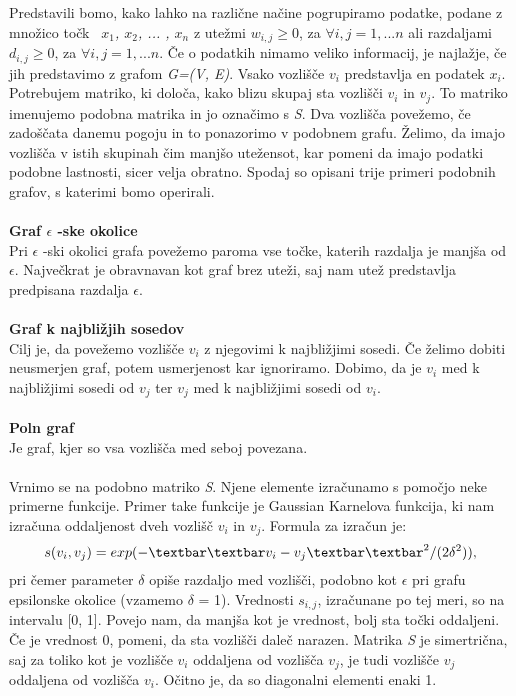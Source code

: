 \documentclass[a4paper, 10pt]{article}
\begin{document}
Predstavili bomo, kako lahko na različne načine pogrupiramo podatke, podane z množico točk \textsl{\ $x_1$, $x_2$, ... , $x_n$ } z utežmi $w_{i,j} \geq 0$, za $\forall i,j = 1, ... n$ ali razdaljami $d_{i,j} \geq 0$, za $\forall i,j = 1, ... n$. Če o podatkih nimamo veliko informacij, je najlažje, če jih predstavimo z grafom \textsl{G=(V, E)}. Vsako vozlišče $v_i$ predstavlja en podatek \textsl{$x_i$}. Potrebujem matriko, ki določa, kako blizu skupaj sta vozlišči $v_i$ in $v_j$. To matriko imenujemo podobna matrika in jo označimo s \textsl{S}. Dva vozlišča povežemo, če zadoščata danemu pogoju in to ponazorimo v podobnem grafu. Želimo, da imajo vozlišča v istih skupinah čim manjšo utežensot, kar pomeni da imajo podatki podobne lastnosti, sicer velja obratno. Spodaj so opisani trije primeri podobnih grafov, s katerimi bomo operirali.\\
\\
\textbf{Graf $\epsilon$ -ske okolice}\\
Pri $\epsilon$ -ski okolici grafa povežemo paroma vse točke, katerih razdalja je manjša od $\epsilon$. Največkrat je obravnavan kot graf brez uteži, saj nam utež predstavlja predpisana razdalja $\epsilon$.\\
\\
\textbf{Graf k najbližjih sosedov}\\
Cilj je, da povežemo vozlišče $v_i$ z njegovimi k najbližjimi sosedi. Če želimo dobiti neusmerjen graf, potem usmerjenost kar ignoriramo. Dobimo, da je $v_i$ med k najbližjimi sosedi od $v_j$ ter $v_j$ med k najbližjimi sosedi od $v_i$.\\
\\
\textbf{Poln graf}\\
Je graf, kjer so vsa vozlišča med seboj povezana.\\
\\
Vrnimo se na podobno matriko \textsl{S}. Njene elemente izračunamo s pomočjo neke primerne funkcije. Primer take funkcije je Gaussian Karnelova funkcija, ki nam izračuna oddaljenost dveh vozlišč $v_i$ in $v_j$. Formula za izračun je:$$s(v_i, v_j) = exp(-\textbar\textbar v_i - v_j \textbar\textbar^2 / (2\delta^2)),$$pri čemer parameter $\delta$ opiše razdaljo med vozlišči, podobno kot $\epsilon$ pri grafu epsilonske okolice (vzamemo $\delta$ = 1).  Vrednosti $s_{i,j}$, izračunane po tej meri, so na intervalu [0, 1]. Povejo nam, da manjša kot je vrednost, bolj sta točki oddaljeni. Če je vrednost 0, pomeni, da sta vozlišči daleč narazen. Matrika \textsl{S} je simertrična, saj za toliko kot je vozlišče $v_i$ oddaljena od vozlišča $v_j$, je tudi vozlišče $v_j$ oddaljena od vozlišča $v_i$. Očitno je, da so diagonalni elementi enaki 1.\\
\end{document}
